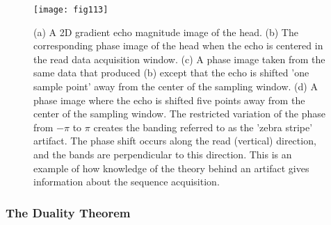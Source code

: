 \begin{figure}[H]
    \centering
    \texttt{[image: fig113]}
    \caption{(a) A 2D gradient echo magnitude image of the head. (b) The corresponding phase image of the head when the echo is centered in the read data acquisition window. (c) A phase image taken from the same data that produced (b) except that the echo is shifted 'one sample point' away from the center of the sampling window. (d) A phase image where the echo is shifted five points away from the center of the sampling window. The restricted variation of the phase from $−\pi$ to $\pi$ creates the banding referred to as the 'zebra stripe' artifact. The phase shift occurs along the read (vertical) direction, and the bands are perpendicular to this direction. This is an example of how knowledge of the theory behind an artifact gives information about the sequence acquisition. \newline \courtesy}
    \label{fig:fig113}
\end{figure}

%
\subsubsection{The Duality Theorem}

